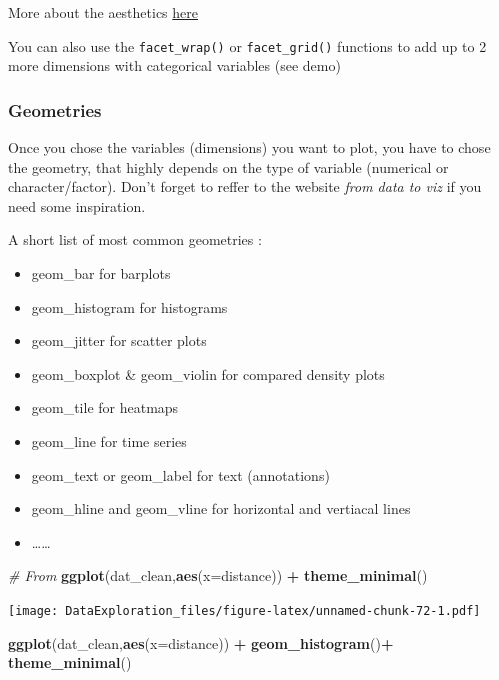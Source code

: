 \documentclass[
]{book}
\newenvironment{Shaded}{\begin{snugshade}}{\end{snugshade}}
\newcommand{\CommentTok}[1]{\textcolor[rgb]{0.56,0.35,0.01}{\textit{#1}}}
\newcommand{\DataTypeTok}[1]{\textcolor[rgb]{0.13,0.29,0.53}{#1}}
\newcommand{\KeywordTok}[1]{\textcolor[rgb]{0.13,0.29,0.53}{\textbf{#1}}}
\newcommand{\NormalTok}[1]{#1}
\newcommand{\OperatorTok}[1]{\textcolor[rgb]{0.81,0.36,0.00}{\textbf{#1}}}
\newcommand{\StringTok}[1]{\textcolor[rgb]{0.31,0.60,0.02}{#1}}
\providecommand{\tightlist}{%
  \setlength{\itemsep}{0pt}\setlength{\parskip}{0pt}}
\begin{document}
More about the aesthetics \href{https://ggplot2.tidyverse.org/articles/ggplot2-specs.html}{here}

You can also use the \texttt{facet\_wrap()} or \texttt{facet\_grid()} functions to add up to 2 more dimensions with categorical variables (see demo)

\hypertarget{geometries}{%
\subsubsection{Geometries}\label{geometries}}

Once you chose the variables (dimensions) you want to plot, you have to chose the geometry, that highly depends on the type of variable (numerical or character/factor). Don't forget to reffer to the website \emph{from data to viz} if you need some inspiration.

A short list of most common geometries :

\begin{itemize}
\tightlist
\item
  geom\_bar for barplots
\item
  geom\_histogram for histograms
\item
  geom\_jitter for scatter plots
\item
  geom\_boxplot \& geom\_violin for compared density plots
\item
  geom\_tile for heatmaps
\item
  geom\_line for time series
\item
  geom\_text or geom\_label for text (annotations)
\item
  geom\_hline and geom\_vline for horizontal and vertiacal lines
\item
  \ldots\ldots{}
\end{itemize}

\begin{Shaded}
\begin{Highlighting}[]
\CommentTok{# From }
\KeywordTok{ggplot}\NormalTok{(dat_clean,}\KeywordTok{aes}\NormalTok{(}\DataTypeTok{x=}\NormalTok{distance)) }\OperatorTok{+}
\StringTok{  }\KeywordTok{theme_minimal}\NormalTok{()}
\end{Highlighting}
\end{Shaded}

\texttt{[image: DataExploration\_files/figure-latex/unnamed-chunk-72-1.pdf]}

\begin{Shaded}
\begin{Highlighting}[]
\KeywordTok{ggplot}\NormalTok{(dat_clean,}\KeywordTok{aes}\NormalTok{(}\DataTypeTok{x=}\NormalTok{distance)) }\OperatorTok{+}\StringTok{ }\KeywordTok{geom_histogram}\NormalTok{()}\OperatorTok{+}
\StringTok{  }\KeywordTok{theme_minimal}\NormalTok{()}
\end{Highlighting}
\end{Shaded}
\end{document}
